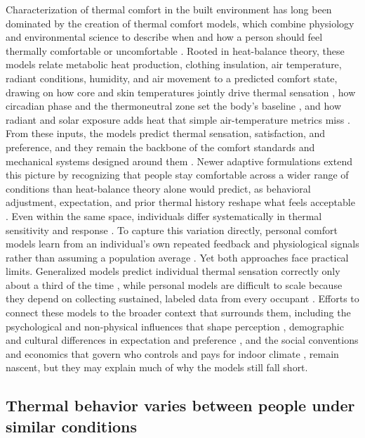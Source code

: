 \documentclass[final,5p,times,twocolumn]{elsarticle}
\begin{document}
Characterization of thermal comfort in the built environment has long been dominated by the creation of thermal comfort models, which combine physiology and environmental science to describe when and how a person should feel thermally comfortable or uncomfortable \citep{Fanger1972-xq}.
Rooted in heat-balance theory, these models relate metabolic heat production, clothing insulation, air temperature, radiant conditions, humidity, and air movement to a predicted comfort state, drawing on how core and skin temperatures jointly drive thermal sensation \citep{Frank1999-ju}, how circadian phase and the thermoneutral zone set the body's baseline \citep{Krauchi2002-aq, Kingma2012-lm}, and how radiant and solar exposure adds heat that simple air-temperature metrics miss \citep{Halawa2014-ek, Hodder2007-qo}.
From these inputs, the models predict thermal sensation, satisfaction, and preference, and they remain the backbone of the comfort standards and mechanical systems designed around them \citep{Cheung2019-fs}.
Newer adaptive formulations extend this picture by recognizing that people stay comfortable across a wider range of conditions than heat-balance theory alone would predict, as behavioral adjustment, expectation, and prior thermal history reshape what feels acceptable \citep{Dear1998-va, Schweiker2020-pw}.
Even within the same space, individuals differ systematically in thermal sensitivity and response \citep{Rupp2022-lq, Wang2018-aj}.
To capture this variation directly, personal comfort models learn from an individual's own repeated feedback and physiological signals rather than assuming a population average \citep{Arakawa_Martins2022-vh}.
Yet both approaches face practical limits.
Generalized models predict individual thermal sensation correctly only about a third of the time \citep{Cheung2019-fs}, while personal models are difficult to scale because they depend on collecting sustained, labeled data from every occupant \citep{Arakawa_Martins2022-vh}.
Efforts to connect these models to the broader context that surrounds them, including the psychological and non-physical influences that shape perception \citep{Castaldo2018-ih, Chinazzo2019-ye}, demographic and cultural differences in expectation and preference \citep{Karjalainen2012-ag, Naheed2021-ce}, and the social conventions and economics that govern who controls and pays for indoor climate \citep{Shove2003-lf, Gillingham2012-nf}, remain nascent, but they may explain much of why the models still fall short.


\subsection{Thermal behavior varies between people under similar conditions}\label{sec:individual-differences}
\end{document}
